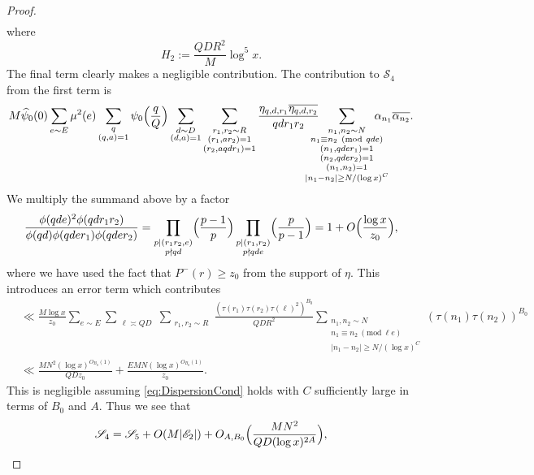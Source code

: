 \documentclass[10pt]{amsart}
\theoremstyle{plain}
\numberwithin{equation}{section}
\newcommand{\Mod}[1]{\ (\mathrm{mod}\ #1)}
\renewcommand{\hat}[1]{\widehat #1}
\begin{document}
\begin{proof}
\begin{align*}
\end{align*}
where
\[
H_2:=\frac{Q D R^2}{M}\log^5{x}.
\]
The final term clearly makes a negligible contribution. The contribution to $\mathscr{S}_{4}$ from the first term is
\begin{align*}
M\hat{\psi}_0(0)\sum_{e\sim E}\mu^2(e)\sum_{\substack{q\\ (q,a)=1}}\psi_0\Bigl(\frac{q}{Q}\Bigr)\sum_{\substack{d\sim D\\ (d,a)=1}}\sum_{\substack{r_1,r_2\sim R\\ (r_1,a r_2)=1\\ (r_2,a q d r_1)=1}}\frac{\eta_{q,d,r_1}\overline{\eta_{q,d,r_2}} }{q d r_1 r_2}\hspace{-0.5cm}\sum_{\substack{n_1,n_2\sim N\\ n_1\equiv n_2\Mod{q d e}\\ (n_1,q d e r_1)=1\\(n_2,q d e r_2)=1\\ (n_1,n_2)=1\\ |n_1-n_2|\ge N/(\log{x})^C}}\hspace{-0.5cm}\alpha_{n_1}\overline{\alpha_{n_2}}.
\end{align*}
We multiply the summand above by a factor
\[
\frac{\phi(q d e)^2\phi(q d r_1 r_2)}{\phi(q d)\phi(q d e r_1)\phi(q d e r_2)}=\prod_{\substack{p|(r_1r_2,e)\\ p\nmid qd}}\Bigl(\frac{p-1}{p}\Bigr)\prod_{\substack{p|(r_1,r_2)\\ p\nmid qde}}\Bigl(\frac{p}{p-1}\Bigr)=1+O\Bigl(\frac{\log{x}}{z_0}\Bigr),
\]
where we have used the fact that $P^-(r)\ge z_0$ from the support of $\eta$. This introduces an error term which contributes 
\begin{align*}
&\ll \frac{M \log{x}}{z_0}\sum_{e\sim E}\sum_{\substack{\ell \asymp Q D}}\sum_{\substack{r_1,r_2\sim R}}\frac{(\tau(r_1)\tau(r_2)\tau(\ell)^2)^{B_0}}{Q D R^2}\sum_{\substack{n_1,n_2\sim N\\ n_1\equiv n_2\Mod{\ell e} \\ |n_1-n_2|\ge N/(\log{x})^C}}(\tau(n_1)\tau(n_2))^{B_0}\\
&\ll \frac{MN^2(\log{x})^{O_{B_0}(1)}}{Q D z_0}+\frac{E M N(\log{x})^{O_{B_0}(1)}}{z_0}.
\end{align*}
This is negligible assuming \eqref{eq:DispersionCond} holds with $C$ sufficiently large in terms of $B_0$ and $A$. Thus we see that
\begin{equation}
\mathscr{S}_{4}=\mathscr{S}_5+O(M|\mathscr{E}_2|)+O_{A,B_0}\Bigl(\frac{MN^2}{Q D (\log{x})^{2A}}\Bigr), \label{eq:S23*Estimate}

\end{equation}
\end{proof}
\end{document}
